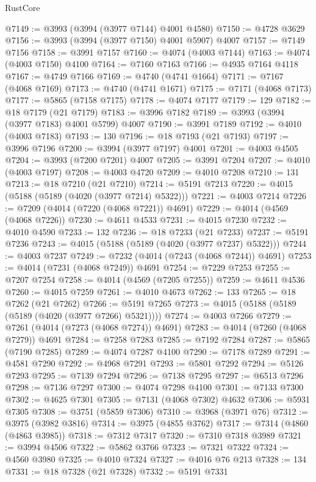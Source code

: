 \begin{lexlean}{RustCore}
\begin{coremodule}
@7149 := @3993 (@3994 (@3977 @7144) @4001 @4580)
@7150 := @4728 @3629
@7156 := @3993 (@3994 (@3977 @7150) @4001 @5907) @4007
@7157 := @7149 @7156
@7158 := @3991 @7157
@7160 := @4074 (@4003 @7144)
@7163 := @4074 (@4003 @7150) @4100
@7164 := @7160 @7163
@7166 := @4935 @7164 @4118
@7167 := @4749 @7166
@7169 := @4740 (@4741 @1664)
@7171 := @7167 (@4068 @7169)
@7173 := @4740 (@4741 @1671)
@7175 := @7171 (@4068 @7173)
@7177 := @5865 (@7158 @7175)
@7178 := @4074 @7177
@7179 := 129
@7182 := @18 @7179 (@21 @7179)
@7183 := @3996 @7182
@7189 := @3993 (@3994 (@3977 @7183) @4001 @5799) @4007
@7190 := @3991 @7189
@7192 := @4010 (@4003 @7183)
@7193 := 130
@7196 := @18 @7193 (@21 @7193)
@7197 := @3996 @7196
@7200 := @3994 (@3977 @7197) @4001
@7201 := @4003 @4505
@7204 := @3993 (@7200 @7201) @4007
@7205 := @3991 @7204
@7207 := @4010 (@4003 @7197)
@7208 := @4003 @4720
@7209 := @4010 @7208
@7210 := 131
@7213 := @18 @7210 (@21 @7210)
@7214 := @5191 @7213
@7220 := @4015 (@5188 (@5189 (@4020 (@3977 @7214) @5322)))
@7221 := @4003 @7214
@7226 := @7209 (@4014 (@7220 (@4068 @7221)) @4691)
@7229 := @4014 (@4569 (@4068 @7226))
@7230 := @4611 @4533
@7231 := @4015 @7230
@7232 := @4010 @4590
@7233 := 132
@7236 := @18 @7233 (@21 @7233)
@7237 := @5191 @7236
@7243 := @4015 (@5188 (@5189 (@4020 (@3977 @7237) @5322)))
@7244 := @4003 @7237
@7249 := @7232 (@4014 (@7243 (@4068 @7244)) @4691)
@7253 := @4014 (@7231 (@4068 @7249)) @4691
@7254 := @7229 @7253
@7255 := @7207 @7254
@7258 := @4014 (@4569 (@7205 @7255))
@7259 := @4611 @4536
@7260 := @4015 @7259
@7261 := @4010 @4673
@7262 := 133
@7265 := @18 @7262 (@21 @7262)
@7266 := @5191 @7265
@7273 := @4015 (@5188 (@5189 (@5189 (@4020 (@3977 @7266) @5321))))
@7274 := @4003 @7266
@7279 := @7261 (@4014 (@7273 (@4068 @7274)) @4691)
@7283 := @4014 (@7260 (@4068 @7279)) @4691
@7284 := @7258 @7283
@7285 := @7192 @7284
@7287 := @5865 (@7190 @7285)
@7289 := @4074 @7287 @4100
@7290 := @7178 @7289
@7291 := @4581 @7290
@7292 := @4968 @7291
@7293 := @5801 @7292
@7294 := @5126 @7293
@7295 := @7139 @7294
@7296 := @7138 @7295
@7297 := @6513 @7296
@7298 := @7136 @7297
@7300 := @4074 @7298 @4100
@7301 := @7133 @7300
@7302 := @4625 @7301
@7305 := @7131 (@4068 @7302) @4632
@7306 := @5931 @7305
@7308 := @3751 (@5859 @7306)
@7310 := @3968 (@3971 @76)
@7312 := @3975 (@3982 @3816)
@7314 := @3975 (@4855 @3762)
@7317 := @7314 (@4860 (@4863 @3985))
@7318 := @7312 @7317
@7320 := @7310 @7318 @3989
@7321 := @3994 @4506
@7322 := @5862 @3766
@7323 := @7321 @7322
@7324 := @4560 @3980
@7325 := @4010 @7324
@7327 := @4016 @76 @213
@7328 := 134
@7331 := @18 @7328 (@21 @7328)
@7332 := @5191 @7331

\end{coremodule}
\end{lexlean}
